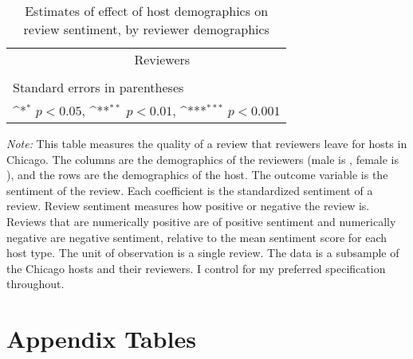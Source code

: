 \begin{landscape}
	\begin{table}[htbp]\centering
		\def\sym#1{\ifmmode^{#1}\else\(^{#1}\)\fi}
		\caption{Estimates of effect of host demographics on review sentiment, by reviewer demographics}
		\begin{tabular}{l *{8}{c}}
			\hline\hline
			&\multicolumn{8}{c}{Reviewers} \\
			\cmidrule(r){2-9}\\
				
			\hline\hline
			\multicolumn{9}{l}{\footnotesize Standard errors in parentheses}\\
			\multicolumn{9}{l}{\footnotesize \sym{*} \(p<0.05\), \sym{**} \(p<0.01\), \sym{***} \(p<0.001\)}\\
		\end{tabular}
	\label{table:sentiment}
	
		\begin{tablenotes}
			
			\item {\it Note:} This table measures the quality of a review that reviewers leave for hosts in Chicago. The columns are the demographics of the reviewers (male is , female is ), and the rows are the demographics of the host. The outcome variable is the sentiment of the review. Each coefficient is the standardized sentiment of a review. Review sentiment measures how positive or negative the review is. Reviews that are numerically positive are of positive sentiment and numerically negative are negative sentiment, relative to the mean sentiment score for each host type. The unit of observation is a single review. The data is a subsample of the Chicago hosts and their reviewers. I control for my preferred specification throughout. 
			
		\end{tablenotes}
		
	\end{table}
\end{landscape}












\newpage

\section*{Appendix Tables}


